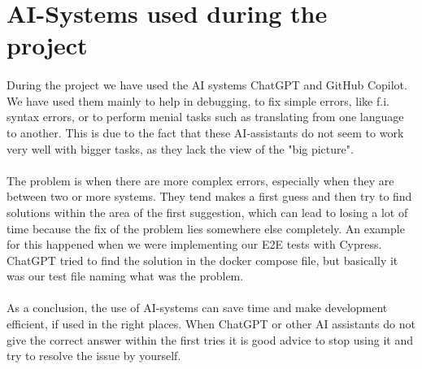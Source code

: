 \section{AI-Systems used during the project}
\paragraph{} During the project we have used the AI systems ChatGPT and GitHub Copilot. We have used them mainly to help in debugging, to fix simple errors, like f.i. syntax errors, or to perform menial tasks such as translating from one language to another. This is due to the fact that these AI-assistants do not seem to work very well with bigger tasks, as they lack the view of the "big picture".

\paragraph{} The problem is when there are more complex errors, especially when they are between two or more systems. They tend makes a first guess and then try to find solutions within the area of the first suggestion, which can lead to losing a lot of time because the fix of the problem lies somewhere else completely. An example for this happened when we were implementing our E2E tests with Cypress. ChatGPT tried to find the solution in the docker compose file, but basically it was our test file naming what was the problem.

\paragraph{} As a conclusion, the use of AI-systems can save time and make development efficient, if used in the right places. When ChatGPT or other AI assistants do not give the correct answer within the first tries it is good advice to stop using it and try to resolve the issue by yourself. 